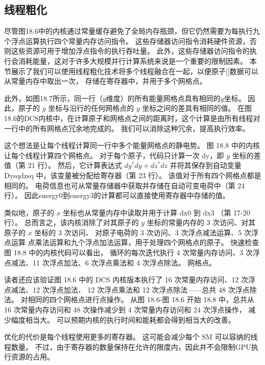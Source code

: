 \subsection{线程粗化}
尽管图18.6中的内核通过常量缓存避免了全局内存瓶颈，但它仍然需要为每执行九个浮点运算执行四个常量内存访问指令。 
这些存储器访问指令消耗硬件资源，否则这些资源可用于增加浮点指令的执行吞吐量。 
此外，这些存储器访问指令的执行会消耗能量，这对于许多大规模并行计算系统来说是一个重要的限制因素。 
本节展示了我们可以使用线程粗化技术将多个线程融合在一起，以便原子[]数据可以从常量内存中取出一次，
存储在寄存器中，并用于多个网格点。

此外，如图18.7所示，同一行（$y$维度）的所有能量网格点具有相同的$y$坐标。 
因此，原子的 $y$ 坐标与沿行的任何网格点的 $y$ 坐标之间的差具有相同的值。 
在图18.6的DCS内核中，在计算原子和网格点之间的距离时，这个计算是由所有线程对一行中的所有网格点冗余地完成的。 
我们可以消除这种冗余，提高执行效率。

这个想法是让每个线程计算同一行中多个能量网格点的静电势。 图 18.8 中的内核让每个线程计算四个网格点。 
对于每个原子，代码只计算一次 dy，即 $y$ 坐标的差值（第 21 行）。 
然后，它计算表达式 $d y^{*} d y+d z^{*} d z$ 并将其保存到自动变量 Dysqdzsq 中，该变量被分配给寄存器（第 23 行）。 
该值对于所有四个网格点都是相同的。 电荷信息也可从常量存储器中获取并存储在自动可变电荷中（第 24 行）。 
因此energy0到energy3的计算都可以直接使用寄存器中存储的值。

类似地，原子的 $x$ 坐标也从常量内存中读取并用于计算 $\mathrm{dx} 0$ 到 $\mathrm{dx} 3$ （第 17-20 行）。 
总而言之，该内核消除了对其原子的 $y$ 坐标的常量内存的 3 次访问、对其原子的 $x$ 坐标的 3 次访问、
对原子电荷的 3 次访问、3 次浮点减法运算、5 次浮点运算 点乘法运算和九个浮点加法运算，用于处理四个网格点的原子。 
快速检查图 18.8 中的内核代码可以看出，
循环的每次迭代执行 4 次常量内存访问、3 次浮点减法、11 次浮点加法、6 次浮点乘法和 4 次浮点除法。 网格点。

读者还应该验证图 18.6 中的 DCS 内核版本执行了 16 次常量内存访问、12 次浮点减法、12 次浮点加法、
12 次浮点乘法和 12 次浮点除法——总共 48 次浮点除法。 对相同的四个网格点进行点操作。 
从图 18.6-图 18.6 开始 18.8 中，总共从 16 次常量内存访问和 48 次操作减少到 4 次常量内存访问和 24 次浮点操作，
减少幅度相当大。 可以预期内核的执行时间和能耗都会得到相当大的改善。

优化的代价是每个线程使用更多的寄存器。 这可能会减少每个 SM 可以容纳的线程数量。 
不过，由于寄存器的数量保持在允许的限度内，因此并不会限制GPU执行资源的占用。

